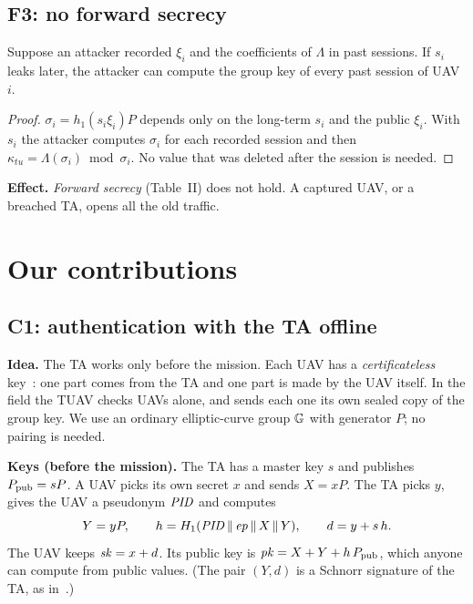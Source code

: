 \documentclass[11pt,openany]{report}
\begin{document}
\section{F3: no forward secrecy}
\begin{theorem}\label{thm:f3}
Suppose an attacker recorded $\xi_i$ and the coefficients of $\Lambda$ in past sessions. If $s_i$ leaks later, the attacker can compute the group key of
every past session of UAV $i$.
\end{theorem}
\begin{proof}
$\sigma_i=h_1(s_i\xi_i)P$ depends only on the long-term $s_i$ and the public $\xi_i$. With $s_i$ the attacker computes $\sigma_i$ for each recorded
session and then $\kappa_{tu}=\Lambda(\sigma_i)\bmod\sigma_i$. No value that was deleted after the session is needed.
\end{proof}
\textbf{Effect.} \emph{Forward secrecy} (Table~II) does not hold. A captured UAV, or a breached TA, opens all the old traffic.

\chapter{Our contributions}\label{ch:contrib}
\section{C1: authentication with the TA offline}\label{sec:c1}
\textbf{Idea.} The TA works only before the mission. Each UAV has a \emph{certificateless} key~\cite{alriyami}: one part comes from the TA and one
part is made by the UAV itself. In the field the TUAV checks UAVs alone, and sends each one its own sealed copy of the group key. We use an ordinary
elliptic-curve group $\mathbb{G}$ with generator $P$; no pairing is needed.

\textbf{Keys (before the mission).} The TA has a master key $s$ and publishes $P_{\mathrm{pub}}=sP$. A UAV picks its own secret $x$ and sends $X=xP$. The TA picks
$y$, gives the UAV a pseudonym $\mathit{PID}$ and computes
\[ Y=yP,\qquad h=H_1(\mathit{PID}\,\|\,\mathit{ep}\,\|\, X\,\|\, Y),\qquad d=y+s\,h . \]
The UAV keeps $\mathit{sk}=x+d$. Its public key is $\mathit{pk}=X+Y+h\,P_{\mathrm{pub}}$, which anyone can compute from public values. (The pair $(Y,d)$ is a Schnorr signature
of the TA, as in~\cite{gg09}.)
\end{document}
